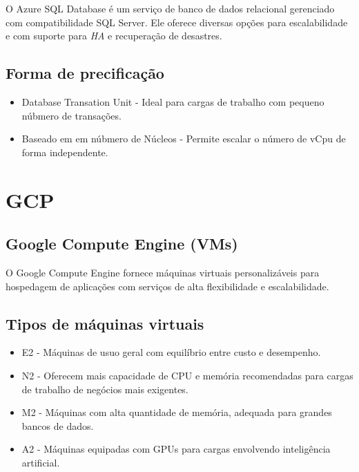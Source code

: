 \documentclass[a4paper,12pt]{article}
\begin{document}
O Azure SQL Database é um serviço de banco de dados relacional gerenciado com compatibilidade SQL Server. Ele oferece diversas opções para escalabilidade e com suporte para \textit{HA} e  recuperação de desastres.

\subsection*{Forma de precificação}

\begin{itemize}

  \item Database Transation Unit - Ideal para cargas de trabalho com pequeno núbmero de transações.
  \item Baseado em em núbmero de Núcleos - Permite escalar o número de vCpu de forma independente.
  
\end{itemize}

\break

\section*{GCP}

\subsection*{Google Compute Engine (VMs)}

O Google Compute Engine fornece máquinas virtuais personalizáveis para hospedagem de aplicações com serviços de alta flexibilidade e escalabilidade.

\subsection*{Tipos de máquinas virtuais}
\begin{itemize}
  \item{E2} - Máquinas de usuo geral com equilíbrio entre custo e desempenho. 
  \item{N2} - Oferecem mais capacidade de CPU e memória recomendadas para cargas de trabalho de negócios mais exigentes.
  \item{M2} - Máquinas com alta quantidade de memória, adequada para grandes bancos de dados. 
  \item{A2} - Máquinas equipadas com GPUs para cargas envolvendo inteligência artificial.

\end{itemize}
\end{document}
